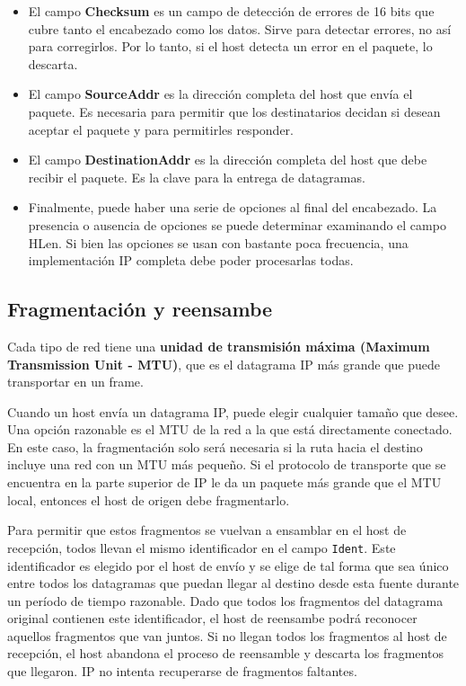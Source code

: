 \begin{itemize}
  \item El campo \textbf{Checksum} es un campo de detección de errores de 16 bits que cubre tanto el encabezado como los datos. Sirve para detectar errores, no así para corregirlos. Por lo tanto, si el host detecta un error en el paquete, lo descarta.
  \item El campo \textbf{SourceAddr} es la dirección completa del host que envía el paquete. Es necesaria para permitir que los destinatarios decidan si desean aceptar el paquete y para permitirles responder.
  \item El campo \textbf{DestinationAddr} es la dirección completa del host que debe recibir el paquete.  Es la clave para la entrega de datagramas.
  \item Finalmente, puede haber una serie de opciones al final del encabezado. La presencia o ausencia de opciones se puede determinar examinando el campo HLen. Si bien las opciones se usan con bastante poca frecuencia, una implementación IP completa debe poder procesarlas todas.
\end{itemize}

\subsection{Fragmentación y reensambe}
Cada tipo de red tiene una \textbf{unidad de transmisión máxima (Maximum Transmission Unit - MTU)}, que es el datagrama IP más grande que puede transportar en un frame.

Cuando un host envía un datagrama IP, puede elegir cualquier tamaño que desee. Una opción razonable es el MTU de la red a la que está directamente conectado. En este caso, la fragmentación solo será necesaria si la ruta hacia el destino incluye una red con un MTU más pequeño. Si el protocolo de transporte que se encuentra en la parte superior de IP le da un paquete más grande que el MTU local, entonces el host de origen debe fragmentarlo.

Para permitir que estos fragmentos se vuelvan a ensamblar en el host de recepción, todos llevan el mismo identificador en el campo \texttt{Ident}. Este identificador es elegido por el host de envío y se elige de tal forma que sea único entre todos los datagramas que puedan llegar al destino desde esta fuente durante un período de tiempo razonable. Dado que todos los fragmentos del datagrama original contienen este identificador, el host de reensambe podrá reconocer aquellos fragmentos que van juntos. Si no llegan todos los fragmentos al host de recepción, el host abandona el proceso de reensamble y descarta los fragmentos que llegaron. IP no intenta recuperarse de fragmentos faltantes.

